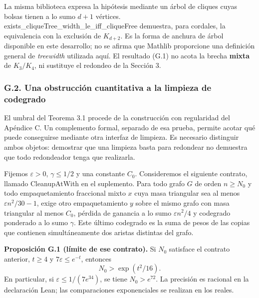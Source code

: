\documentclass[spanish,11pt,a4paper]{article}
\begin{document}
La misma biblioteca expresa la hipótesis mediante un árbol de cliques cuyas bolsas tienen a lo sumo \(d+1\) vértices. {\ttfamily\small exists\_\discretionary{\hbox{\ensuremath{\hookrightarrow}}}{}{}cliqueTree\_\discretionary{\hbox{\ensuremath{\hookrightarrow}}}{}{}width\_\discretionary{\hbox{\ensuremath{\hookrightarrow}}}{}{}le\_\discretionary{\hbox{\ensuremath{\hookrightarrow}}}{}{}iff\_\discretionary{\hbox{\ensuremath{\hookrightarrow}}}{}{}cliqueFree} demuestra, para cordales, la equivalencia con la exclusión de \(K_{d+2}\). Es la forma de anchura de árbol disponible en este desarrollo; no se afirma que Mathlib proporcione una definición general de \emph{treewidth} utilizada aquí. El resultado (G.1) no acota la brecha \textbf{mixta} de \(K_3/K_4\), ni sustituye el redondeo de la Sección 3.

\subsubsection{G.2. Una obstrucción cuantitativa a la limpieza de codegrado}\label{g.2.-una-obstruccion-cuantitativa-a-la-limpieza-de-codegrado}

El umbral del Teorema 3.1 procede de la construcción con regularidad del Apéndice C. Un complemento formal, separado de esa prueba, permite acotar qué puede conseguirse mediante otra interfaz de limpieza. Es necesario distinguir ambos objetos: demostrar que una limpieza basta para redondear no demuestra que todo redondeador tenga que realizarla.

Fijemos \(\varepsilon>0\), \(\gamma\le1/2\) y una constante \(C_0\). Consideremos el siguiente contrato, llamado {\ttfamily\small CleanupAtWit\discretionary{\hbox{\ensuremath{\hookrightarrow}}}{}{}h} en el suplemento. Para todo grafo \(G\) de orden \(n\ge N_0\) y todo empaquetamiento fraccional mixto \(x\) cuya masa triangular sea al menos \(\varepsilon n^2/30-1\), exige otro empaquetamiento \(y\) sobre el mismo grafo con masa triangular al menos \(C_0\), pérdida de ganancia a lo sumo \(\varepsilon n^2/4\) y codegrado ponderado a lo sumo \(\gamma\). Este último codegrado es la suma de pesos de las copias que contienen simultáneamente dos aristas distintas del grafo.

\textbf{Proposición G.1 (límite de ese contrato).} Si \(N_0\) satisface el contrato anterior, \(t\ge4\) y \(7\varepsilon\le e^{-t}\), entonces \[
N_0>\exp(t^2/16).
\tag{G.2}
\] En particular, si \(\varepsilon\le1/(7e^{34})\), se tiene \(N_0>e^{72}\). La precisión es racional en la declaración Lean; las comparaciones exponenciales se realizan en los reales.
\end{document}
